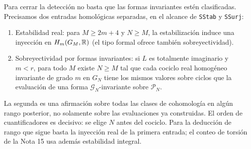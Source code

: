 Para cerrar la detección no basta que las formas invariantes estén clasificadas. Precisamos dos entradas homológicas separadas, en el alcance de \texttt{SStab} y \texttt{SSurj}:

\begin{enumerate}
\item Estabilidad real: para $M\ge2m+4$ y $N\ge M$, la estabilización induce una inyección en $H_m(G_M,\mathbb{R})$ (el tipo formal ofrece también sobreyectividad).
\item Sobreyectividad por formas invariantes: si $L$ es totalmente imaginario y $m<r$, para todo $M$ existe $N\ge M$ tal que cada cociclo real homogéneo invariante de grado $m$ en $G_N$ tiene los mismos valores sobre ciclos que la evaluación de una forma $\mathcal G_N$-invariante sobre $\mathcal P_N$.
\end{enumerate}

La segunda es una afirmación sobre todas las clases de cohomología en algún rango posterior, no solamente sobre las evaluaciones ya construidas. El orden de cuantificadores es decisivo: se elige $N$ antes del cociclo. Para la deducción de rango que sigue basta la inyección real de la primera entrada; el conteo de torsión de la Nota 15 usa además estabilidad integral.

